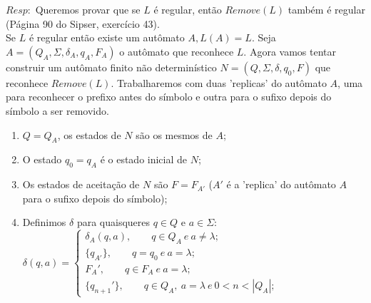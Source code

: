 \documentclass{homework}
\begin{document}
	$Resp:$	Queremos provar que se $L$ é regular, então $Remove(L)$ também é regular (Página 90 do Sipser, exercício 43).\\
	Se $L$ é regular então existe um autômato $A,L(A)=L$. Seja $A = (Q_A,\Sigma,\delta_A,q_A,F_A)$ o autômato que reconhece $L$. Agora vamos tentar construir um autômato finito não determinístico $N = (Q,\Sigma,\delta,q_0,F)$ que reconhece $Remove(L)$. Trabalharemos com duas 'replicas' do autômato $A$, uma para reconhecer o prefixo antes do símbolo e outra para o sufixo depois do símbolo a ser removido.
	\begin{enumerate}
		\item $Q = Q_A$, os estados de $N$ são os mesmos de $A$;
		\item O estado $q_0 = q_A$ é o estado inicial de $N$;
		\item Os estados de aceitação de $N$ são $F = F_{A'}$ ($A'$ é a 'replica' do autômato $A$ para o sufixo depois do símbolo);
		\item Definimos $\delta$ para quaisqueres $q \in Q$ e $a \in \Sigma$:\\
		$\delta(q,a) = \begin{cases}
							\delta_A(q,a),\qquad q \in Q_A \ e \ a \neq \lambda;\\
							\{q_{A'}\},\qquad q = q_0 \ e \ a = \lambda;\\
							F_A',\qquad q \in F_A \ e \ a = \lambda;\\
							\{q_{n+1}'\}, \qquad  q \in Q_A,\ a = \lambda \ e \ 0<n<|Q_A|;
					   \end{cases}					  
		$
	\end{enumerate}
\end{document}
